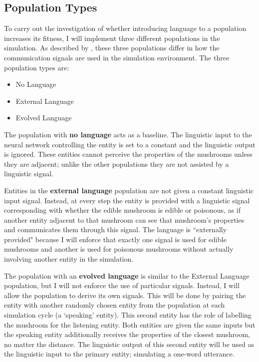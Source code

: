 \documentclass[12pt,a4paper]{report}
\begin{document}
\subsection{Population Types}\label{section:populations}

To carry out the investigation of whether introducing language to a population increases its fitness, I will implement three different populations in the simulation. As described by \cite{Cangelosi1998}, these three populations differ in how the communication signals are used in the simulation environment. The three population types are:

\begin{itemize}
	\item No Language
	\item External Language
	\item Evolved Language
\end{itemize}

The population with {\bf no language} acts as a baseline. The linguistic input to the neural network controlling the entity is set to a constant and the linguistic output is ignored. These entities cannot perceive the properties of the mushrooms unless they are adjacent; unlike the other populations they are not assisted by a linguistic signal.

Entities in the {\bf external language} population are not given a constant linguistic input signal. Instead, at every step the entity is provided with a linguistic signal corresponding with whether the edible mushroom is edible or poisonous, as if another entity adjacent to that mushroom can see that mushroom's properties and communicates them through this signal. The language is ``externally provided" because I will enforce that exactly one signal is used for edible mushrooms and another is used for poisonous mushrooms without actually involving another entity in the simulation. 

The population with an {\bf evolved language} is similar to the External Language population, but I will not enforce the use of particular signals. Instead, I will allow the population to derive its own signals. This will be done by pairing the entity with another randomly chosen entity from the population at each simulation cycle (a `speaking' entity). This second entity has the role of labelling the mushroom for the listening entity. Both entities are given the same inputs but the speaking entity additionally receives the properties of the closest mushroom, no matter the distance. The linguistic output of this second entity will be used as the linguistic input to the primary entity; simulating a one-word utterance.
\end{document}

